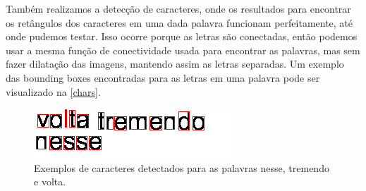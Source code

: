 \documentclass[english, 
               brazil, 
               bsc] %
               {dcomp-abntex2}
\begin{document}
Também realizamos a detecção de caracteres, onde os resultados para encontrar os retângulos dos caracteres em uma dada palavra funcionam perfeitamente, até onde pudemos testar. Isso ocorre porque as letras são conectadas, então podemos usar a mesma função de conectividade usada para encontrar as palavras, mas sem fazer dilatação das imagens, mantendo assim as letras separadas. Um exemplo das bounding boxes encontradas para as letras em uma palavra pode ser visualizado na \autoref{chars}.


\begin{figure}[h]
        \caption{\label{chars} \small Exemplos de caracteres detectados para as palavras nesse, tremendo e volta. }
        \begin{center}
            \includegraphics[scale=0.55]{./images/ocr.png}
        \end{center}
\end{figure}
\end{document}
